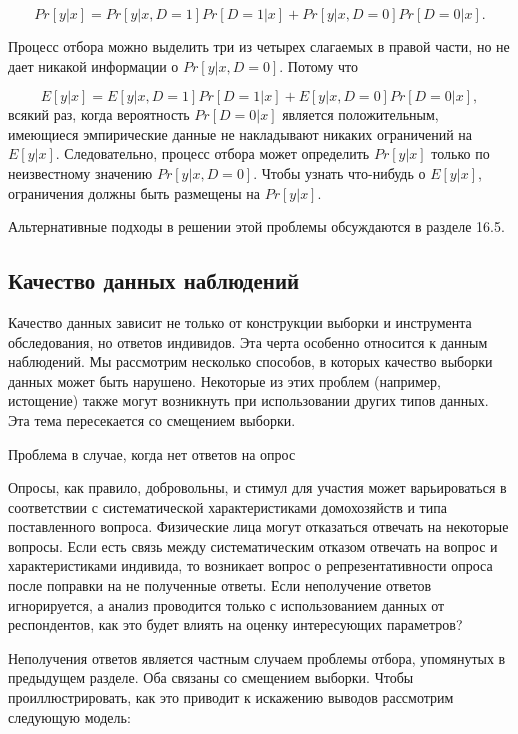 \begin{equation}
Pr[y|x]=Pr[y|x,D=1]Pr[D=1|x]+Pr[y|x,D=0]Pr[D=0|x].
\end{equation}

Процесс отбора можно выделить три из четырех слагаемых в правой части, но не дает никакой информации о  
$Pr[y|x, D = 0]$. Потому что

\[
E[y|x]=E[y|x,D=1]Pr[D=1|x]+E[y|x,D=0]Pr[D=0|x],
\]
всякий раз, когда вероятность $Pr[D=0|x]$ является положительным, имеющиеся эмпирические данные не накладывают никаких ограничений на $E[y|x]$. Следовательно, процесс отбора может определить $Pr[y|x]$ только по неизвестному значению $Pr[y|x,D=0]$. Чтобы узнать что-нибудь о $E[y|x]$, ограничения должны быть размещены на $Pr[y|x]$.


Альтернативные подходы в решении этой проблемы обсуждаются в разделе 16.5.


\subsection{Качество данных наблюдений}

Качество данных зависит не только от конструкции выборки и инструмента обследования, но ответов индивидов. Эта черта особенно относится к данным наблюдений. Мы рассмотрим несколько способов, в которых качество выборки данных может быть нарушено. Некоторые из этих проблем (например, истощение) также могут возникнуть при использовании других типов данных. Эта тема пересекается со смещением выборки.


\begin{center}
Проблема в случае, когда нет ответов на опрос
\end{center}


Опросы, как правило, добровольны, и стимул для участия может варьироваться в соответствии с систематической характеристиками домохозяйств и типа поставленного вопроса. Физические лица могут отказаться отвечать на некоторые вопросы. Если есть связь между систематическим отказом отвечать на вопрос и характеристиками индивида, то возникает вопрос о репрезентативности опроса после поправки на не полученные ответы. Если неполучение ответов игнорируется, а  анализ проводится только с использованием данных от респондентов, как это будет влиять на оценку интересующих параметров?


Неполучения ответов является частным случаем проблемы отбора, упомянутых в предыдущем разделе. Оба связаны со смещением выборки. Чтобы проиллюстрировать, как это приводит к искажению выводов рассмотрим следующую модель:


